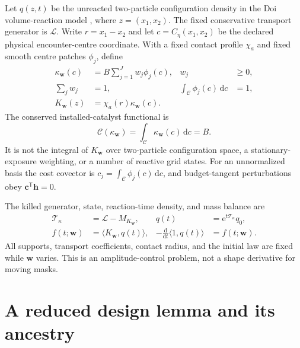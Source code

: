 \documentclass[aps,physrev,reprint,amsmath,amssymb,longbibliography,floatfix]{revtex4-2}
\newcommand{\dd}{\mathrm d}
\newcommand{\e}{\mathrm e}
\newcommand{\Lfree}{\mathcal L}
\newcommand{\Tkill}{\mathcal T_{\kappa}}
\begin{document}
Let $q(z,t)$ be the unreacted two-particle configuration density in the Doi
volume-reaction model \cite{doi1976stochastic}, where
$z=(x_1,x_2)$.  The fixed conservative transport generator is $\Lfree$.
Write $r=x_1-x_2$ and let $c=C_\eta(x_1,x_2)$ be the declared physical
encounter-centre coordinate.  With a fixed contact profile $\chi_a$ and fixed
smooth centre patches $\phi_j$, define
\begin{align}
 \kappa_{\bm w}(c)&=B\sum_{j=1}^{J}w_j\phi_j(c),
 &w_j&\ge0,\nonumber\\
 \sum_jw_j&=1,
 &\int_{\mathcal C}\phi_j(c)\,\dd c&=1,\nonumber\\
 K_{\bm w}(z)&=\chi_a(r)\kappa_{\bm w}(c).
\label{eq:field}
\end{align}
The conserved installed-catalyst functional is
\begin{equation}
 \mathcal C(\kappa_{\bm w})
 =\int_{\mathcal C}\kappa_{\bm w}(c)\,\dd c=B.
\label{eq:budget}
\end{equation}
It is not the integral of $K_{\bm w}$ over two-particle configuration space,
a stationary-exposure weighting, or a number of reactive grid states.  For an
unnormalized basis the cost covector is
$c_j=\int_{\mathcal C}\phi_j(c)\,\dd c$, and budget-tangent perturbations obey
$\bm c^{\mathsf T}\bm h=0$.

The killed generator, state, reaction-time density, and mass balance are
\begin{align}
 \Tkill&=\Lfree-M_{K_{\bm w}},
 & q(t)&=\e^{t\Tkill}q_0,\nonumber\\
 f(t;\bm w)&=\langle K_{\bm w},q(t)\rangle,
 &-\frac{\dd}{\dd t}\langle1,q(t)\rangle&=f(t;\bm w).
\label{eq:massbalance}
\end{align}
All supports, transport coefficients, contact radius, and the initial law are
fixed while $\bm w$ varies.  This is an amplitude-control problem, not a shape
derivative for moving masks.

\section{A reduced design lemma and its ancestry}\label{sec:gig}
\end{document}
